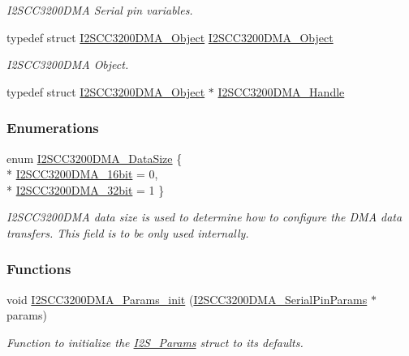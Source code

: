 \begin{DoxyCompactItemize}
\begin{DoxyCompactList}\small\item\em I2\+S\+C\+C3200\+D\+M\+A Serial pin variables. \end{DoxyCompactList}\item 
typedef struct \hyperlink{struct_i2_s_c_c3200_d_m_a___object}{I2\+S\+C\+C3200\+D\+M\+A\+\_\+\+Object} \hyperlink{_i2_s_c_c3200_d_m_a_8h_a3ee6e1f3af6d47f9d3f0fb4145789f9c}{I2\+S\+C\+C3200\+D\+M\+A\+\_\+\+Object}
\begin{DoxyCompactList}\small\item\em I2\+S\+C\+C3200\+D\+M\+A Object. \end{DoxyCompactList}\item 
typedef struct \hyperlink{struct_i2_s_c_c3200_d_m_a___object}{I2\+S\+C\+C3200\+D\+M\+A\+\_\+\+Object} $\ast$ \hyperlink{_i2_s_c_c3200_d_m_a_8h_ab6238a057e94d1d1a22e8c8bee266872}{I2\+S\+C\+C3200\+D\+M\+A\+\_\+\+Handle}
\end{DoxyCompactItemize}
\subsubsection*{Enumerations}
\begin{DoxyCompactItemize}
\item 
enum \hyperlink{_i2_s_c_c3200_d_m_a_8h_a712825340a80cc76e6ce4d6330ca3687}{I2\+S\+C\+C3200\+D\+M\+A\+\_\+\+Data\+Size} \{ \\*
\hyperlink{_i2_s_c_c3200_d_m_a_8h_a712825340a80cc76e6ce4d6330ca3687a01609448c24f97fd53129de27ad0bee5}{I2\+S\+C\+C3200\+D\+M\+A\+\_\+16bit} = 0, 
\\*
\hyperlink{_i2_s_c_c3200_d_m_a_8h_a712825340a80cc76e6ce4d6330ca3687afee360b86e4f90ebd95c2fe404bf0d16}{I2\+S\+C\+C3200\+D\+M\+A\+\_\+32bit} = 1
 \}
\begin{DoxyCompactList}\small\item\em I2\+S\+C\+C3200\+D\+M\+A data size is used to determine how to configure the D\+M\+A data transfers. This field is to be only used internally. \end{DoxyCompactList}\end{DoxyCompactItemize}
\subsubsection*{Functions}
\begin{DoxyCompactItemize}
\item 
void \hyperlink{_i2_s_c_c3200_d_m_a_8h_a0d576148ac5d09bcec51323f6d5884c7}{I2\+S\+C\+C3200\+D\+M\+A\+\_\+\+Params\+\_\+init} (\hyperlink{struct_i2_s_c_c3200_d_m_a___serial_pin_params}{I2\+S\+C\+C3200\+D\+M\+A\+\_\+\+Serial\+Pin\+Params} $\ast$params)
\begin{DoxyCompactList}\small\item\em Function to initialize the \hyperlink{struct_i2_s___params}{I2\+S\+\_\+\+Params} struct to its defaults. \end{DoxyCompactList}\end{DoxyCompactItemize}
